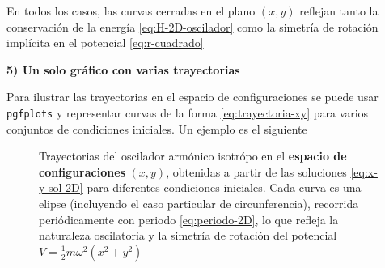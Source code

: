 \documentclass{article}
\begin{document}
En todos los casos, las curvas cerradas en el plano $(x,y)$ reflejan tanto la
conservación de la energía \eqref{eq:H-2D-oscilador} como la simetría de rotación
implícita en el potencial \eqref{eq:r-cuadrado}

\textcolor{trueblue}{\textbf{5) Un solo gráfico con varias trayectorias}}

Para ilustrar las trayectorias en el espacio de configuraciones se puede usar
\texttt{pgfplots} y representar curvas de la forma \eqref{eq:trayectoria-xy}
para varios conjuntos de condiciones iniciales. Un ejemplo es el siguiente

\begin{figure}[H]
\centering
{}
\caption{
Trayectorias del oscilador armónico isotrópo en el \textbf{espacio de
configuraciones} $(x,y)$, obtenidas a partir de las soluciones
\eqref{eq:x-y-sol-2D} para diferentes condiciones iniciales.  
Cada curva es una elipse (incluyendo el caso particular de circunferencia),
recorrida periódicamente con periodo \eqref{eq:periodo-2D}, lo que refleja la
naturaleza oscilatoria y la simetría de rotación del potencial
$V=\tfrac{1}{2}m\omega^{2}(x^{2}+y^{2})$
}
\label{fig:trayectorias-xy-2D}
\end{figure}
\end{document}
